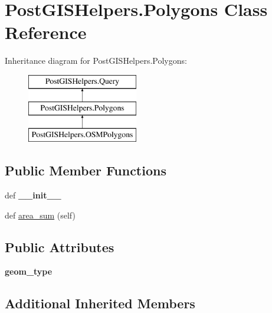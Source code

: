 \hypertarget{class_post_g_i_s_helpers_1_1_polygons}{}\section{Post\+G\+I\+S\+Helpers.\+Polygons Class Reference}
\label{class_post_g_i_s_helpers_1_1_polygons}
Inheritance diagram for Post\+G\+I\+S\+Helpers.\+Polygons\+:\begin{figure}[H]
\begin{center}
\leavevmode
\includegraphics[height=3.000000cm]{class_post_g_i_s_helpers_1_1_polygons}
\end{center}
\end{figure}
\subsection*{Public Member Functions}
\begin{DoxyCompactItemize}
\item 
\hypertarget{class_post_g_i_s_helpers_1_1_polygons_a77591d8421e5d6296fb75b7e5b30eb9d}{}def {\bfseries \+\_\+\+\_\+init\+\_\+\+\_\+}\label{class_post_g_i_s_helpers_1_1_polygons_a77591d8421e5d6296fb75b7e5b30eb9d}

\item 
def \hyperlink{class_post_g_i_s_helpers_1_1_polygons_a510ea7ccacca4a6158164e06d6a2bb87}{area\+\_\+sum} (self)
\end{DoxyCompactItemize}
\subsection*{Public Attributes}
\begin{DoxyCompactItemize}
\item 
\hypertarget{class_post_g_i_s_helpers_1_1_polygons_a0edee8c1382c28d0d16b28e8d267c950}{}{\bfseries geom\+\_\+type}\label{class_post_g_i_s_helpers_1_1_polygons_a0edee8c1382c28d0d16b28e8d267c950}

\end{DoxyCompactItemize}
\subsection*{Additional Inherited Members}


